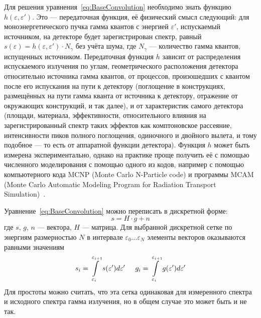 Для решения уравнения~\ref{eq:BaseConvolution} необходимо знать функцию $ h( \varepsilon, \varepsilon' ) $. Это --- передаточная функция, её физический смысл следующий: для моноэнергетического пучка гамма квантов с энергией $\varepsilon'$, испускаемый источником, на детекторе будет зарегистрирован спектр, равный $s(\varepsilon) = h(\varepsilon, \varepsilon') \cdot N_{\gamma}$ без учёта шума, где $N_{\gamma}$ --- количество гамма квантов, испущенных источником. Передаточная функция $h$ зависит от распределения испускаемого излучения по углам, геометрического расположения детектора относительно источника гамма квантов, от процессов, произошедших с квантом после его испускания на пути к детектору (поглощение в конструкциях, размещённых на пути гамма кванта от источника к детектору, отражение от окружающих конструкций, и так далее), и от характеристик самого детектора (площади, материала, эффективности, относительного влияния на зарегистрированный спектр таких эффектов как комптоновское рассеяние, интенсивности пиков полного поглощения, одиночного и двойного вылета, и тому подобное --- то есть от аппаратной функции детектора). Функция $h$ может быть измерена экспериментально, однако на практике проще получить её с помощью численного моделирования с помощью одного из кодов, например с помощью компьютерного кода MCNP (Monte Carlo N-Particle code) и программы MCAM (Monte Carlo Automatic Modeling Program for Radiation Transport Simulation)~\cite{Hendricks2004,Fischer2005,Wu2009,Forster2004}.

Уравнение~\ref{eq:BaseConvolution} можно переписать в дискретной форме:
\begin{equation}
  \label{eq:BaseConvolutionMatrix}
  s = H \cdot g + n 
\end{equation}
где $s$, $g$, $n$ --- вектора, $H$ --- матрица. Для выбранной дискретной сетке по энергиям размерностью $N$ в интервале $ \varepsilon_0 \ldots \varepsilon_N $ элементы векторов оказываются равными значениям
\begin{equation*}
  s_i = \int \limits_{\varepsilon_i}^{\varepsilon_{i+1}} s( \varepsilon' ) d \varepsilon' \hspace{5mm} 
  g_i = \int \limits_{\varepsilon_i}^{\varepsilon_{i+1}} g( \varepsilon' ) d \varepsilon'
\end{equation*}
Для простоты можно считать, что эта сетка одинаковая для измеренного спектра и исходного спектра гамма излучения, но в общем случае это может быть и не так.

